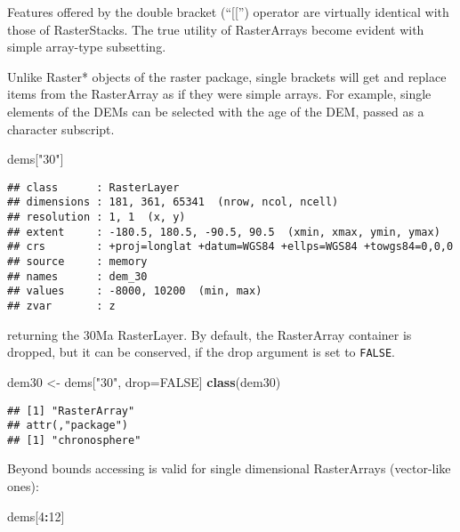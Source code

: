 \documentclass[]{article}
\newenvironment{Shaded}{\begin{snugshade}}{\end{snugshade}}
\newcommand{\KeywordTok}[1]{\textcolor[rgb]{0.13,0.29,0.53}{\textbf{#1}}}
\newcommand{\DecValTok}[1]{\textcolor[rgb]{0.00,0.00,0.81}{#1}}
\newcommand{\StringTok}[1]{\textcolor[rgb]{0.31,0.60,0.02}{#1}}
\newcommand{\OtherTok}[1]{\textcolor[rgb]{0.56,0.35,0.01}{#1}}
\newcommand{\OperatorTok}[1]{\textcolor[rgb]{0.81,0.36,0.00}{\textbf{#1}}}
\newcommand{\NormalTok}[1]{#1}
\begin{document}
Features offered by the double bracket (``{[}{[}'') operator are
virtually identical with those of RasterStacks. The true utility of
RasterArrays become evident with simple array-type subsetting.

Unlike Raster* objects of the raster package, single brackets will get
and replace items from the RasterArray as if they were simple arrays.
For example, single elements of the DEMs can be selected with the age of
the DEM, passed as a character subscript.

\begin{Shaded}
\begin{Highlighting}[]
\NormalTok{dems[}\StringTok{"30"}\NormalTok{]}
\end{Highlighting}
\end{Shaded}

\begin{verbatim}
## class      : RasterLayer 
## dimensions : 181, 361, 65341  (nrow, ncol, ncell)
## resolution : 1, 1  (x, y)
## extent     : -180.5, 180.5, -90.5, 90.5  (xmin, xmax, ymin, ymax)
## crs        : +proj=longlat +datum=WGS84 +ellps=WGS84 +towgs84=0,0,0 
## source     : memory
## names      : dem_30 
## values     : -8000, 10200  (min, max)
## zvar       : z
\end{verbatim}

returning the 30Ma RasterLayer. By default, the RasterArray container is
dropped, but it can be conserved, if the drop argument is set to
\texttt{FALSE}.

\begin{Shaded}
\begin{Highlighting}[]
\NormalTok{dem30 <-}\StringTok{ }\NormalTok{dems[}\StringTok{"30"}\NormalTok{, drop=}\OtherTok{FALSE}\NormalTok{]}
\KeywordTok{class}\NormalTok{(dem30)}
\end{Highlighting}
\end{Shaded}

\begin{verbatim}
## [1] "RasterArray"
## attr(,"package")
## [1] "chronosphere"
\end{verbatim}

Beyond bounds accessing is valid for single dimensional RasterArrays
(vector-like ones):

\begin{Shaded}
\begin{Highlighting}[]
\NormalTok{dems[}\DecValTok{4}\OperatorTok{:}\DecValTok{12}\NormalTok{]}
\end{Highlighting}
\end{Shaded}
\end{document}
